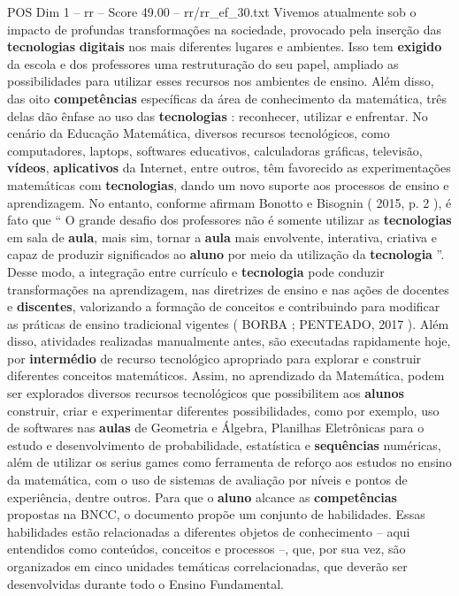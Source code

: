\begin{textsample}{POS Dim 1 – rr – Score 49.00 – rr/rr\_ef\_30.txt}
Vivemos atualmente sob o impacto de profundas transformações na sociedade, provocado pela inserção das \textbf{tecnologias} \textbf{digitais} nos mais diferentes lugares e ambientes.
Isso tem \textbf{exigido} da escola e dos professores uma restruturação do seu papel, ampliado as possibilidades para utilizar esses recursos nos ambientes de ensino.
Além disso, das oito \textbf{competências} específicas da área de conhecimento da matemática, três delas dão ênfase ao uso das \textbf{tecnologias} : reconhecer, utilizar e enfrentar.
No cenário da Educação Matemática, diversos recursos tecnológicos, como computadores, laptops, softwares educativos, calculadoras gráficas, televisão, \textbf{vídeos}, \textbf{aplicativos} da Internet, entre outros, têm favorecido as experimentações matemáticas com \textbf{tecnologias}, dando um novo suporte aos processos de ensino e aprendizagem.
No entanto, conforme afirmam Bonotto e Bisognin ( 2015, p. 2 ), é fato que “ O grande desafio dos professores não é somente utilizar as \textbf{tecnologias} em sala de \textbf{aula}, mais sim, tornar a \textbf{aula} mais envolvente, interativa, criativa e capaz de produzir significados ao \textbf{aluno} por meio da utilização da \textbf{tecnologia} ”.
Desse modo, a integração entre currículo e \textbf{tecnologia} pode conduzir transformações na aprendizagem, nas diretrizes de ensino e nas ações de docentes e \textbf{discentes}, valorizando a formação de conceitos e contribuindo para modificar as práticas de ensino tradicional vigentes ( BORBA ; PENTEADO, 2017 ).
Além disso, atividades realizadas manualmente antes, são executadas rapidamente hoje, por \textbf{intermédio} de recurso tecnológico apropriado para explorar e construir diferentes conceitos matemáticos.
Assim, no aprendizado da Matemática, podem ser explorados diversos recursos tecnológicos que possibilitem aos \textbf{alunos} construir, criar e experimentar diferentes possibilidades, como por exemplo, uso de softwares nas \textbf{aulas} de Geometria e Álgebra, Planilhas Eletrônicas para o estudo e desenvolvimento de probabilidade, estatística e \textbf{sequências} numéricas, além de utilizar os serius games como ferramenta de reforço aos estudos no ensino da matemática, com o uso de sistemas de avaliação por níveis e pontos de experiência, dentre outros.
Para que o \textbf{aluno} alcance as \textbf{competências} propostas na BNCC, o documento propõe um conjunto de habilidades.
Essas habilidades estão relacionadas a diferentes objetos de conhecimento – aqui entendidos como conteúdos, conceitos e processos –, que, por sua vez, são organizados em cinco unidades temáticas correlacionadas, que deverão ser desenvolvidas durante todo o Ensino Fundamental.

\end{textsample}
